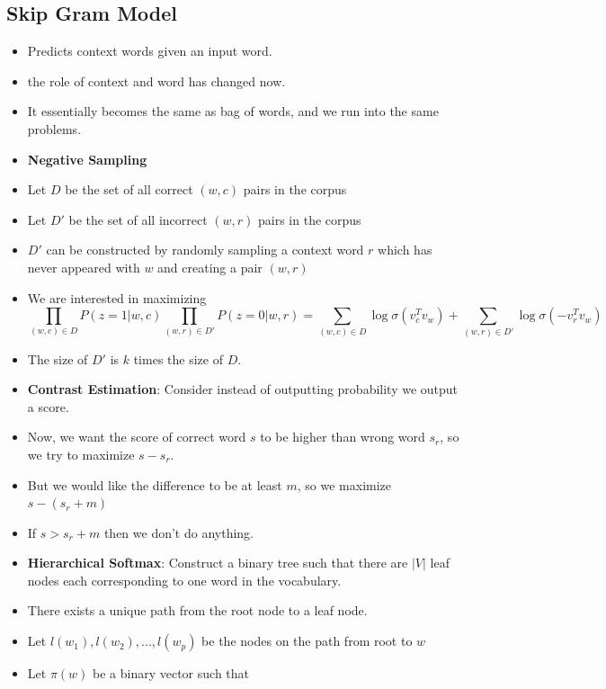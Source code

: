 \documentclass[a4paper]{article}
\begin{document}
\subsection{Skip Gram Model}
\begin{itemize}
    \item Predicts context words given an input word.
    \item the role of context and word has changed now.
    \item It essentially becomes the same as bag of words, and we run into the same problems.
    \item \textbf{Negative Sampling}
    \item Let $D$ be the set of all correct $(w, c)$ pairs in the corpus
    \item Let $D'$ be the set of all incorrect $(w, r)$ pairs in the corpus
    \item $D'$ can be constructed by randomly sampling a context word $r$ which has never appeared with $w$ and creating a pair $(w, r)$
    \item We are interested in maximizing
    \begin{equation*}
        \prod_{(w,c)\in D}P(z=1|w,c)\prod_{(w,r)\in D'}P(z=0|w,r)=\sum_{(w,c)\in D}\log \sigma(v_c^Tv_w)+\sum_{(w,r)\in D'}\log \sigma(-v_r^Tv_w)
    \end{equation*}
    \item The size of $D'$ is $k$ times the size of $D$.
    \item \textbf{Contrast Estimation}: Consider instead of outputting probability we output a score.
    \item Now, we want the score of correct word $s$ to be higher than wrong word $s_r$, so we try to maximize $s-s_r$.
    \item But we would like the difference to be at least $m$, so we maximize $s-(s_r+m)$
    \item If $s>s_r+m$ then we don't do anything.
    \item \textbf{Hierarchical Softmax}: Construct a binary tree such that there are $|V|$ leaf nodes each corresponding to one word in the vocabulary.
    \item There exists a unique path from the root node to a leaf node.
    \item Let $l(w_1), l(w_2), ..., l(w_p)$ be the nodes on the path from root to $w$
    \item Let $\pi(w)$ be a binary vector such that
    \begin{equation*}

\end{equation*}
\end{itemize}
\end{document}
